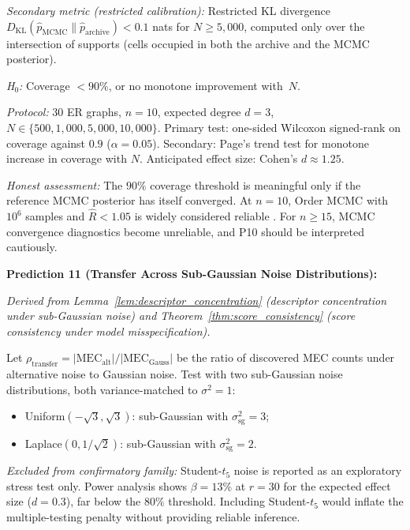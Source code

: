 \documentclass{article}
\theoremstyle{definition}
\theoremstyle{plain}
\theoremstyle{remark}
\begin{document}
\emph{Secondary metric (restricted calibration):} Restricted KL divergence
$D_{\mathrm{KL}}(\hat{p}_{\mathrm{MCMC}} \| \hat{p}_{\mathrm{archive}})
< 0.1$ nats for $N \geq 5{,}000$, computed only over the intersection
of supports (cells occupied in both the archive and the MCMC posterior).

\emph{H$_0$:} Coverage $< 90\%$, or no monotone improvement with~$N$.

\emph{Protocol:} 30 ER graphs, $n = 10$, expected degree $d = 3$,
$N \in \{500, 1{,}000, 5{,}000, 10{,}000\}$. Primary test: one-sided
Wilcoxon signed-rank on coverage against $0.9$ ($\alpha = 0.05$).
Secondary: Page's trend test for monotone increase in coverage with $N$.
Anticipated effect size: Cohen's $d \approx 1.25$.

\emph{Honest assessment:} The $90\%$ coverage threshold is meaningful only
if the reference MCMC posterior has itself converged. At $n = 10$, Order
MCMC with $10^6$ samples and $\hat{R} < 1.05$ is widely considered reliable
\citep{friedman2003being}. For $n \geq 15$, MCMC convergence diagnostics
become unreliable, and P10 should be interpreted cautiously.

\medskip

\textbf{Prediction 11 (Transfer Across Sub-Gaussian Noise Distributions):}
\label{pred:transfer}

\emph{Derived from Lemma~\ref{lem:descriptor_concentration} (descriptor
concentration under sub-Gaussian noise) and
Theorem~\ref{thm:score_consistency} (score consistency under model
misspecification).}

Let $\rho_{\mathrm{transfer}} = |\mathrm{MEC}_{\mathrm{alt}}| /
|\mathrm{MEC}_{\mathrm{Gauss}}|$ be the ratio of discovered MEC counts
under alternative noise to Gaussian noise. Test with two sub-Gaussian
noise distributions, both variance-matched to $\sigma^2 = 1$:
\begin{itemize}
  \item Uniform$(-\sqrt{3}, \sqrt{3})$: sub-Gaussian with
    $\sigma_{\mathrm{sg}}^2 = 3$;
  \item Laplace$(0, 1/\sqrt{2})$: sub-Gaussian with
    $\sigma_{\mathrm{sg}}^2 = 2$.
\end{itemize}

\emph{Excluded from confirmatory family:} Student-$t_5$ noise is
reported as an exploratory stress test only. Power analysis shows
$\beta = 13\%$ at $r = 30$ for the expected effect size ($d = 0.3$),
far below the $80\%$ threshold. Including Student-$t_5$ would inflate the
multiple-testing penalty without providing reliable inference.
\end{document}
